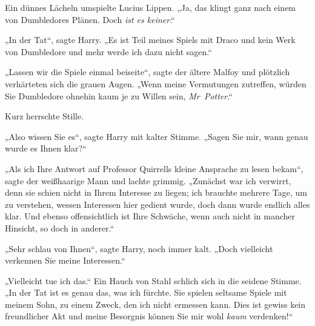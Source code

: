 Ein dünnes Lächeln umspielte Lucius Lippen. „Ja, das klingt ganz nach einem von Dumbledores Plänen. Doch \emph{ist es keiner}.“

„In der Tat“, sagte Harry. „Es ist Teil meines Spiels mit Draco und kein Werk von Dumbledore und mehr werde ich dazu nicht sagen.“

„Lassen wir die Spiele einmal beiseite“, sagte der ältere Malfoy und plötzlich verhärteten sich die grauen Augen. „Wenn meine Vermutungen zutreffen, würden Sie Dumbledore ohnehin kaum je zu Willen sein, \emph{Mr~Potter}.“

Kurz herrschte Stille.

„Also wissen Sie es“, sagte Harry mit kalter Stimme. „Sagen Sie mir, wann genau wurde es Ihnen klar?“

„Als ich Ihre Antwort auf Professor Quirrells kleine Ansprache zu lesen bekam“, sagte der weißhaarige Mann und lachte grimmig. „Zunächst war ich verwirrt, denn sie schien nicht in Ihrem Interesse zu liegen; ich brauchte mehrere Tage, um zu verstehen, wessen Interessen hier gedient wurde, doch dann wurde endlich alles klar. Und ebenso offensichtlich ist Ihre Schwäche, wenn auch nicht in mancher Hinsicht, so doch in anderer.“

„Sehr schlau von Ihnen“, sagte Harry, noch immer kalt. „Doch vielleicht verkennen Sie meine Interessen.“

„Vielleicht tue ich das.“ Ein Hauch von Stahl schlich sich in die seidene Stimme. „In der Tat ist es genau das, was ich fürchte. Sie spielen seltsame Spiele mit meinem Sohn, zu einem Zweck, den ich nicht ermessen kann. Dies ist gewiss kein freundlicher Akt und meine Besorgnis können Sie mir wohl \emph{kaum} verdenken!“

